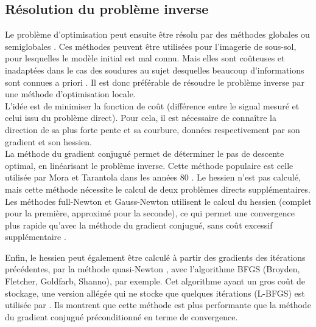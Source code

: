 \documentclass[]{article}
\begin{document}



\subsection*{Résolution du problème inverse}
Le problème d'optimisation peut ensuite être résolu par des méthodes globales ou semiglobales \citep{sen, zhang}. Ces méthodes peuvent être utilisées pour l'imagerie de sous-sol, pour lesquelles le modèle initial est mal connu. Mais elles sont coûteuses et inadaptées dans le cas des soudures au sujet desquelles beaucoup d'informations sont connues a priori \citep{ogilvy,chassignole}. Il est donc préférable de résoudre le problème inverse par une méthode d'optimisation locale.\\


L'idée est de minimiser la fonction de coût (différence entre le signal mesuré et celui issu du problème direct). Pour cela, il est nécessaire de connaître la direction de sa plus forte pente et sa courbure, données respectivement par son gradient et son hessien.\\

La méthode du gradient conjugué permet de déterminer le pas de descente optimal, en linéarisant le problème inverse. Cette méthode populaire est celle utilisée par Mora et Tarantola dans les années 80 \citep{tarantola_84, mora_87a, mora_87b}. Le hessien n'est pas calculé, mais cette méthode nécessite le calcul de deux problèmes directs supplémentaires. \\

Les méthodes full-Newton et Gauss-Newton utilisent le calcul du hessien (complet pour la première, approximé pour la seconde), ce qui permet une convergence plus rapide qu'avec la méthode du gradient conjugué, sans coût excessif supplémentaire \citep{pratt_98}.

Enfin, le hessien peut également être calculé à partir des gradients des itérations précédentes, par la méthode quasi-Newton \citep{nocedal}, avec l'algorithme BFGS (Broyden, Fletcher, Goldfarb, Shanno), par exemple. Cet algorithme ayant un gros coût de stockage, une version allégée qui ne stocke que quelques itérations (L-BFGS) est utilisée par \cite{brossier_2009}. Ils montrent que cette méthode est plus performante que la méthode du gradient conjugué préconditionné en terme de convergence.
\end{document}
